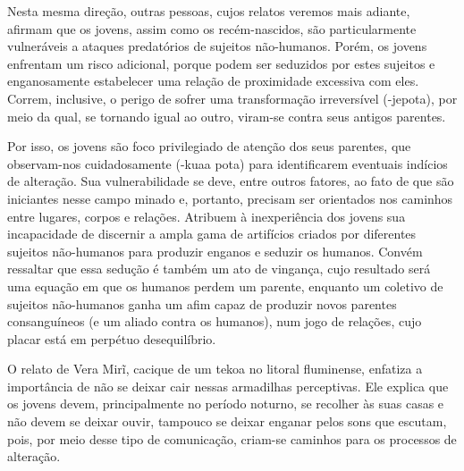 Nesta mesma direção, outras pessoas, cujos relatos veremos mais adiante,
afirmam que os jovens, assim como os recém-nascidos, são
particularmente vulneráveis a ataques predatórios de sujeitos
não-humanos. Porém, os jovens enfrentam um risco adicional, porque
podem ser seduzidos por estes sujeitos e enganosamente estabelecer uma
relação de proximidade excessiva com eles. Correm, inclusive, o perigo
de sofrer uma transformação irreversível (-jepota), por meio da qual,
se tornando igual ao outro, viram-se contra seus antigos parentes.

Por isso, os jovens são foco privilegiado de atenção dos seus parentes,
que observam-nos cuidadosamente (-kuaa pota) para identificarem
eventuais indícios de alteração. Sua vulnerabilidade se deve, entre
outros fatores, ao fato de que são iniciantes nesse campo minado e,
portanto, precisam ser orientados nos caminhos entre lugares, corpos e
relações. Atribuem à inexperiência dos jovens sua incapacidade de
discernir a ampla gama de artifícios criados por diferentes sujeitos
não-humanos para produzir enganos e seduzir os humanos. Convém
ressaltar que essa sedução é também um ato de vingança, cujo resultado
será uma equação em que os humanos perdem um parente, enquanto um
coletivo de sujeitos não-humanos ganha um afim capaz de produzir novos
parentes consanguíneos (e um aliado contra os humanos), num jogo de
relações, cujo placar está em perpétuo desequilíbrio.

O relato de Vera Mirĩ, cacique de um tekoa no litoral fluminense,
enfatiza a importância de não se deixar cair nessas armadilhas
perceptivas. Ele explica que os jovens devem, principalmente no período
noturno, se recolher às suas casas e não devem se deixar ouvir,
tampouco se deixar enganar pelos sons que escutam, pois, por meio desse
tipo de comunicação, criam-se caminhos para os processos de alteração.

